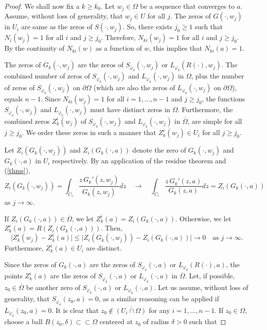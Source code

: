 \documentclass[11pt, reqno]{amsart}
\numberwithin{equation}{section}
\newcommand{\ov}{\overline}
\newcommand{\Om}{\Omega}
\begin{document}
\begin{proof}
        \medskip
		
		We shall now fix a $k\geq k_0$. Let $w_j\in\Omega$ be a sequence that converges to $a$. Assume, without loss of generality, that $w_j\in U$ for all $j$. The zeros of $G(\cdot, w_j)$ in $U_i$ are same as the zeros of $S(\cdot, w_j)$. So, there exists $j_0 \ge 1$ such that $N_i(w_j) = 1$ for all $i$ and $j\geq j_0$. Therefore, $N_{ki}(w_j) = 1$ for all $i$ and $j\geq j_0$. By the continuity of $N_{ki}(w)$ as a function of $w$, this implies that $N_{ki}(a) = 1$.
		
		\medskip
		
		The zeros of $G_k(\cdot,w_j)$ are the zeros of $S_{\varphi_k}(\cdot,w_j)$ or $L_{\varphi_k}(R(\cdot),w_j)$. The combined number of zeros of $S_{\varphi_k}(\cdot, w_j)$ and $L_{\varphi_k}(\cdot, w_j)$ in $\Om$, plus the number of zeros of $S_{\varphi_k}(\cdot,w_j)$ on $\partial\Om$ (which are also the zeros of $L_{\varphi_k}(\cdot,w_j)$ on $\partial\Om$), equals $n-1$. Since $N_{ki}(w_j) =1$ for all $i=1,\ldots,n-1$ and $j\geq j_0$, the functions $S_{\varphi_k}(\cdot,w_j)$ and $L_{\varphi_k}(\cdot,w_j)$ must have distinct zeros in $\Om$. Furthermore, the combined zeros $Z^i_k(w_j)$ of $S_{\varphi_k}(\cdot,w_j)$ and $L_{\varphi_k}(\cdot,w_j)$ in $\overline{\Om}$, are simple for all $j\geq j_0$. We order these zeros in such a manner that $Z^i_k(w_j)\in U_i$ for all $j\geq j_0$.
		
		\medskip
		
		Let $Z_i(G_k(\cdot,w_j))$ and $Z_i(G_k(\cdot,a))$ denote the zero of $G_k(\cdot,w_j)$ and $G_k(\cdot,a)$ in $U_i$ respectively. By an application of the residue theorem and (\ref{thms}),
		\[
		Z_i(G_k(\cdot,w_j))= \int_{C_i} \frac{z\,{G_k}'(z, w_j)}{G_k(z,w_j)} dz 
		\quad 
		\rightarrow
		\quad
		\int_{C_i}  \frac{z\,{G_k}'(z, a)}{G_k(z,a)} dz 
		=
		Z_i(G_k(\cdot,a))
        \]
		as $j\rightarrow\infty$.

    \medskip
        
		If $Z_i(G_k(\cdot,a))\in \ov{\Om}$, we let $Z^i_k(a) = Z_i(G_k(\cdot,a))$. Otherwise, we let $Z^i_k(a) = R(Z_i(G_k(\cdot,a)))$. Then, 
		\[
		\lvert Z^{i}_k(w_j)- Z^i_k(a) \vert 
		\leq 
		\vert Z_i(G_k(\cdot,w_j))- Z_i(G_k(\cdot,a)) \vert
		\rightarrow 0
		\quad
		\text{as }j\rightarrow\infty.
		\]
		Furthermore, $Z^i_k(a)\in U_i$ are distinct.
		
		\medskip
		
		Since the zeros of $G_k(\cdot,a)$ are the zeros of $S_{\varphi_k}(\cdot,a)$ or $L_{\varphi_k}(R(\cdot),a)$, the points $Z^i_k(a)$ are the zeros of $S_{\varphi_k}(\cdot,a)$ or $L_{\varphi_k}(\cdot,a)$ in $\overline{\Om}$. Let, if possible, $z_0\in\ov{\Om}$ be another zero of $S_{\varphi_k}(\cdot,a)$ or $L_{\varphi_k}(\cdot,a)$. Let us assume, without loss of generality, that $S_{\varphi_k}(z_0,a) = 0$, as a similar reasoning can be applied if $L_{\varphi_k}(z_0,a)=0$.  It is clear that $z_0\notin \overline{(U_i\cap \Om)}$ for any $i=1,\ldots,n-1$. If $z_0\in\Om$, choose a ball $B(z_0,\delta)\subset\subset\Om$ centered at $z_0$ of radius $\delta>0$ such that 
		

\end{proof}
\end{document}
